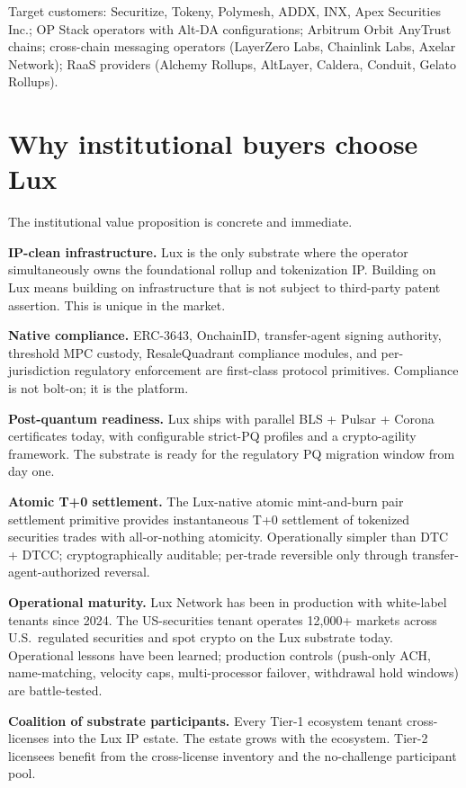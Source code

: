 \documentclass[11pt,letterpaper]{article}
\begin{document}
Target customers: Securitize, Tokeny, Polymesh, ADDX, INX, Apex Securities Inc.; OP Stack operators with Alt-DA configurations; Arbitrum Orbit AnyTrust chains; cross-chain messaging operators (LayerZero Labs, Chainlink Labs, Axelar Network); RaaS providers (Alchemy Rollups, AltLayer, Caldera, Conduit, Gelato Rollups).

\section{Why institutional buyers choose Lux}

The institutional value proposition is concrete and immediate.

\textbf{IP-clean infrastructure.} Lux is the only substrate where the operator simultaneously owns the foundational rollup and tokenization IP. Building on Lux means building on infrastructure that is not subject to third-party patent assertion. This is unique in the market.

\textbf{Native compliance.} ERC-3643, OnchainID, transfer-agent signing authority, threshold MPC custody, ResaleQuadrant compliance modules, and per-jurisdiction regulatory enforcement are first-class protocol primitives. Compliance is not bolt-on; it is the platform.

\textbf{Post-quantum readiness.} Lux ships with parallel BLS + Pulsar + Corona certificates today, with configurable strict-PQ profiles and a crypto-agility framework. The substrate is ready for the regulatory PQ migration window from day one.

\textbf{Atomic T+0 settlement.} The Lux-native atomic mint-and-burn pair settlement primitive provides instantaneous T+0 settlement of tokenized securities trades with all-or-nothing atomicity. Operationally simpler than DTC + DTCC; cryptographically auditable; per-trade reversible only through transfer-agent-authorized reversal.

\textbf{Operational maturity.} Lux Network has been in production with white-label tenants since 2024. The US-securities tenant operates 12,000+ markets across U.S.\ regulated securities and spot crypto on the Lux substrate today. Operational lessons have been learned; production controls (push-only ACH, name-matching, velocity caps, multi-processor failover, withdrawal hold windows) are battle-tested.

\textbf{Coalition of substrate participants.} Every Tier-1 ecosystem tenant cross-licenses into the Lux IP estate. The estate grows with the ecosystem. Tier-2 licensees benefit from the cross-license inventory and the no-challenge participant pool.
\end{document}

